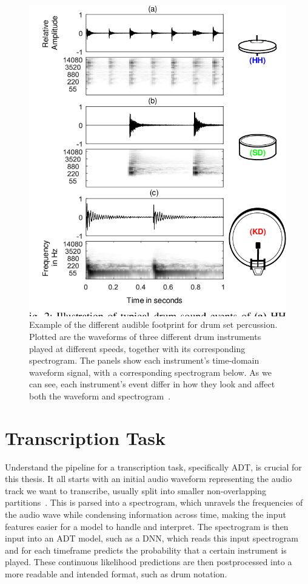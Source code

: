 \begin{figure}[H]
    \centering
    \includegraphics[scale=0.6, trim={0 1cm 0 0},clip]{figures/drumsettimbre}
    \caption{Example of the different audible footprint for drum set percussion. Plotted are the waveforms of three different drum instruments played at different speeds, together with its corresponding spectrogram. The panels show each instrument's time-domain waveform signal, with a corresponding spectrogram below. As we can see, each instrument's event differ in how they look and affect both the waveform and spectrogram~\cite{8350302}.}
    \label{DrumsetTimbreFigure}
\end{figure}

\section{Transcription Task}

Understand the pipeline for a transcription task, specifically \gls{ADT}, is crucial for this thesis. It all starts with an initial audio waveform representing the audio track we want to transcribe, usually split into smaller non-overlapping partitions~\cite{vogl2018multiinstrumentdrumtranscription, gardner2022mt3multitaskmultitrackmusic}. This is parsed into a spectrogram, which unravels the frequencies of the audio wave while condensing information across time, making the input features easier for a model to handle and interpret. The spectrogram is then input into an \gls{ADT} model, such as a \gls{DNN}, which reads this input spectrogram and for each timeframe predicts the probability that a certain instrument is played. These continuous likelihood predictions are then postprocessed into a more readable and intended format, such as drum notation.

